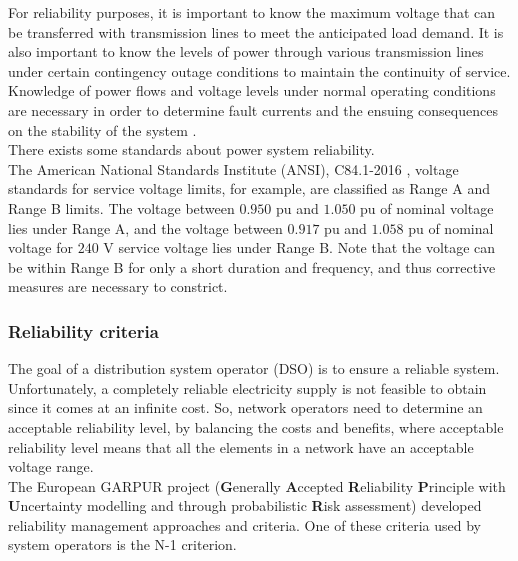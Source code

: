For reliability purposes, it is important to know the maximum voltage that can be
transferred with transmission lines to meet the anticipated load demand. It is also important to know the levels of power through various transmission lines under certain contingency outage conditions to maintain the continuity of service. Knowledge of power flows and voltage levels under normal operating conditions are necessary in order to determine fault currents and the ensuing consequences on the stability of the system \cite{eps}. \\

There exists some standards about power system reliability. \\ The American National Standards Institute (\gls{ANSI}), C84.1-2016 \cite{ansic84}, voltage standards for service voltage limits, for example, are classified as Range A and Range B limits. The voltage between $0.950$ \gls{pu} and $1.050$ \gls{pu} of nominal voltage lies under Range A, and the voltage between $0.917$ \gls{pu} and $1.058$ \gls{pu} of nominal voltage for $240$ \gls{V} service voltage lies under Range B. Note that the voltage can be within Range B for only a short duration and frequency, and thus corrective measures are necessary to constrict.


\subsubsection{Reliability criteria}
\label{ssec:n1cri}
The goal of a distribution system operator (\gls{DSO}) is to ensure a reliable system. Unfortunately, a completely reliable electricity supply is not feasible to obtain since it comes at an infinite cost. So, network operators need to determine an acceptable reliability level, by balancing the costs and benefits, where acceptable reliability level means that all the elements in a network have an acceptable voltage range. \\

The European \gls{GARPUR} project (\textbf{G}enerally \textbf{A}ccepted \textbf{R}eliability \textbf{P}rinciple with \textbf{U}ncertainty modelling and through probabilistic \textbf{R}isk assessment) developed reliability management approaches and criteria. One of these criteria used by system operators is the N-1 criterion. \\

